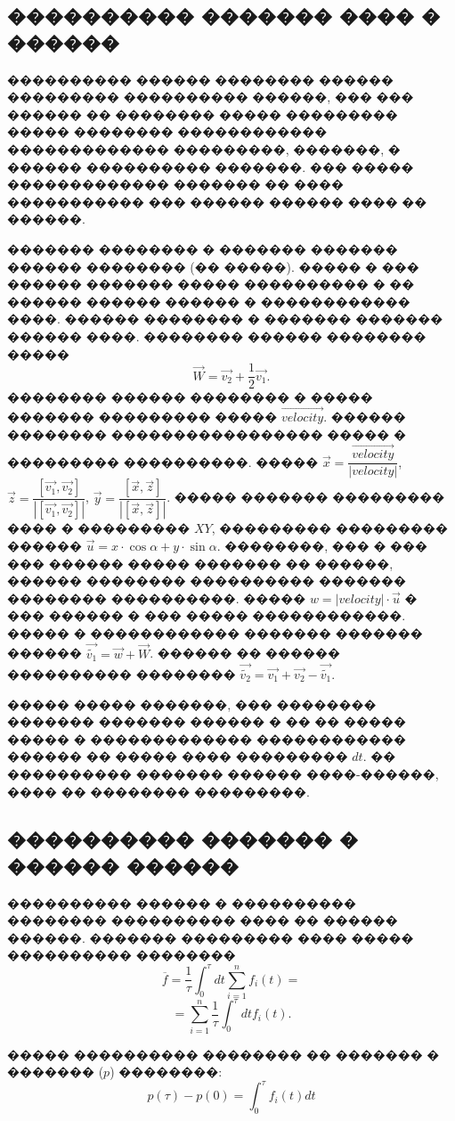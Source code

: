 \subsection{���������� ������� ���� � ������}
\indent ���������� ������ �������� ������ ��������� ���������� ������, ��� ��� ������ �� �������� ����� ��������� ����� �������� ������������ ������������� ���������, �������, � ������ ���������� �������.
��� ����� ������������� ������� �� ���� ����������� ��� ������ ������ ���� �� ������.

������� �������� � ������� ������� ������ �������� (�� �����). ����� � ��� ������ ������� ����� ���������� � �� ������ ������ ������ � ������������ ����. ������ �������� � ������� ������� ������ ����. �������� ������ �������� �����
\begin{equation}
    \vec{W} = \vec{v_2} + \dfrac{1}{2}\vec{v_1}.
\end{equation}
\indent �������� ������ �������� � ����� ������� ��������� ����� $\vec{velocity}$.
������ �������� ����������������� ����� � ��������� ����������. ����� $\vec{x} = \dfrac{\vec{velocity}}{|velocity|}$, $\vec{z} = \dfrac{[\vec{v_1}, \vec{v_2}]}{|[\vec{v_1}, \vec{v_2}]|}$, $\vec{y} = \dfrac{[\vec{x}, \vec{z}]}{|[\vec{x}, \vec{z}]|}$. ����� ������� ��������� ���� � ��������� $XY$, ��������� ��������� ������ $\vec{u} = x \cdot \cos \alpha + y \cdot \sin \alpha$. ��������, ��� � ��� ��� ������ ����� ������� �� ������, ������ �������� ���������� ������� �������� ����������. ����� $w = |velocity| \cdot \vec{u}$ � ��� ������ � ��� ����� ������������. ����� � ������������ ������� ������� ������ $\vec{\widetilde{v_1}} = \vec{w} + \vec{W}$. ������ �� ������ ���������� �������� $\vec{\widetilde{v_2}} = \vec{v_1} + \vec{v_2} - \vec{\widetilde{v_1}}$.

����� ����� �������, ��� �������� ������� ������� ������ � �� �� ����� ����� � ������������� ������������ ������ �� ����� ���� ��������� $dt$. �� ���������� ������� ������ ����-������, ���� �� �������� ���������.
\subsection{���������� ������� � ������ ������}
���������� ������ � ���������� �������� ���������� ���� �� ������ ������. ������� ��������� ���� ����� ���������� ��������
$$
\overline{f} = \dfrac{1}{\tau} \int_0^\tau dt \sum_{i=1}^n f_i(t) =$$
$$
= \sum_{i=1}^n \dfrac{1}{\tau} \int_0^\tau dt f_i(t).
$$

����� ���������� �������� �� ������� � ������� ($p$) ��������:
\[p(\tau) - p(0) = \int_0^\tau f_i(t) dt \]


